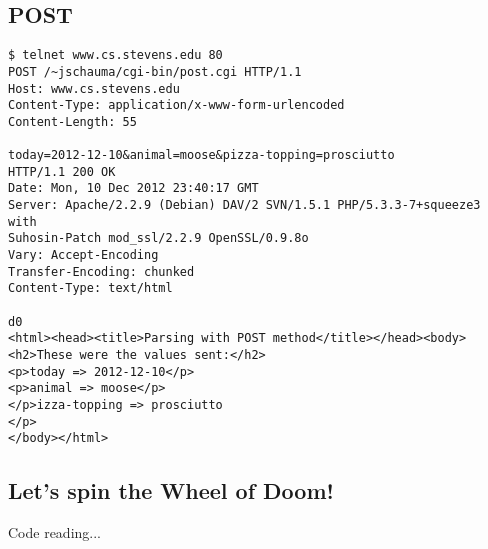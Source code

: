 \documentclass[xga]{xdvislides}
\begin{document}
\subsection{POST}
\small
\begin{verbatim}
$ telnet www.cs.stevens.edu 80
POST /~jschauma/cgi-bin/post.cgi HTTP/1.1
Host: www.cs.stevens.edu
Content-Type: application/x-www-form-urlencoded
Content-Length: 55

today=2012-12-10&animal=moose&pizza-topping=prosciutto
HTTP/1.1 200 OK
Date: Mon, 10 Dec 2012 23:40:17 GMT
Server: Apache/2.2.9 (Debian) DAV/2 SVN/1.5.1 PHP/5.3.3-7+squeeze3 with
Suhosin-Patch mod_ssl/2.2.9 OpenSSL/0.9.8o
Vary: Accept-Encoding
Transfer-Encoding: chunked
Content-Type: text/html

d0
<html><head><title>Parsing with POST method</title></head><body>
<h2>These were the values sent:</h2>
<p>today => 2012-12-10</p>
<p>animal => moose</p>
</p>izza-topping => prosciutto
</p>
</body></html>
\end{verbatim}
\Normalsize

\subsection{Let's spin the Wheel of Doom!}

Code reading...
\end{document}
